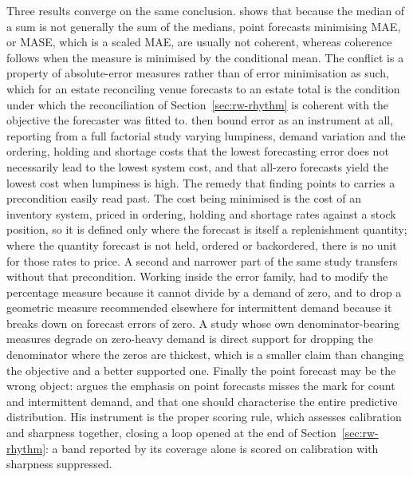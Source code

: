 Three results converge on the same conclusion. \citet{kolassa_we_2023} shows that
because the median of a sum is not generally the sum of the medians, point
forecasts minimising MAE, or MASE, which is a scaled MAE, are usually not
coherent, whereas coherence follows when the measure is minimised by the
conditional mean. The conflict is a property of absolute-error measures rather
than of error minimisation as such, which for an estate reconciling venue
forecasts to an estate total is the condition under which the reconciliation of
Section~\ref{sec:rw-rhythm} is coherent with the objective the forecaster was
fitted to. \citet{chatfield_all-zero_2007} then bound error as an instrument at
all, reporting from a full factorial study varying lumpiness, demand variation
and the ordering, holding and shortage costs that the lowest forecasting error
does not necessarily lead to the lowest system cost, and that all-zero forecasts
yield the lowest cost when lumpiness is high. The remedy that finding points to
carries a precondition easily read past. The cost being minimised is the cost of
an inventory system, priced in ordering, holding and shortage rates against a
stock position, so it is defined only where the forecast is itself a
replenishment quantity; where the quantity forecast is not held, ordered or
backordered, there is no unit for those rates to price. A second and narrower
part of the same study transfers without that precondition. Working inside the
error family, \citeauthor{chatfield_all-zero_2007} had to modify the percentage
measure because it cannot divide by a demand of zero, and to drop a geometric
measure recommended elsewhere for intermittent demand because it breaks down on
forecast errors of zero. A study whose own denominator-bearing measures degrade
on zero-heavy demand is direct support for dropping the denominator where the
zeros are thickest, which is a smaller claim than changing the objective and a
better supported one. Finally the point forecast may be
the wrong object: \citet{kolassa_evaluating_2016} argues the emphasis on point
forecasts misses the mark for count and intermittent demand, and that one should
characterise the entire predictive distribution. His instrument is the proper
scoring rule, which assesses calibration and sharpness together, closing a loop
opened at the end of Section~\ref{sec:rw-rhythm}: a band reported by its coverage
alone is scored on calibration with sharpness suppressed.

